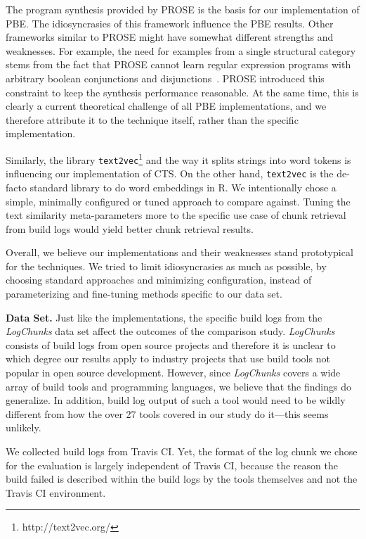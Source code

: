 The program synthesis
provided by PROSE is the basis for our implementation of PBE\@.
The
idiosyncrasies of this framework influence the PBE results.
Other
frameworks similar to PROSE might have somewhat different strengths
and weaknesses.
For example, the need for examples from a single
structural category stems from the fact that PROSE cannot learn
regular expression programs with arbitrary boolean conjunctions and
disjunctions~\citep{mayer2015user}.
PROSE introduced this constraint
to keep the synthesis performance reasonable.
At the same time, this
is clearly a current theoretical challenge of all PBE implementations,
and we therefore attribute it to the technique itself, rather than the
specific implementation.

Similarly, the library
{\tt text2vec}\footnote{http://text2vec.org/}
and the way it splits strings into word tokens is influencing
our implementation of CTS\@.
On the other hand,
{\tt text2vec} is the de-facto standard library to do word embeddings
in R.
We intentionally chose a simple, minimally configured or tuned
approach to compare against.
Tuning the text similarity
meta-parameters more to the specific use case of chunk retrieval from
build logs would yield better chunk retrieval results.

Overall, we believe our implementations and their weaknesses stand
prototypical for the techniques.
We tried to limit idiosyncrasies as
much as possible, by choosing standard approaches and minimizing
configuration, instead of parameterizing and fine-tuning methods
specific to our data set.

\textbf{Data Set.}
Just like the implementations, the specific build logs from the
\emph{LogChunks} data set affect
the outcomes of the comparison study.
\emph{LogChunks} consists of build
logs from open source projects and therefore it is unclear to which
degree our results apply to industry projects that use build tools not
popular in open source development.
However, since \emph{LogChunks}
covers a wide array of build tools and programming languages, we
believe that the findings do generalize.
In addition, build log output
of such a tool would need to be wildly different from how the over 27
tools covered in our study do it---this seems unlikely.

We collected build logs from
Travis CI.
Yet, the format of the log chunk we chose for the
evaluation is largely independent of Travis CI\@, because the reason
the build failed is described within the build logs by the tools
themselves and not the Travis CI environment.

